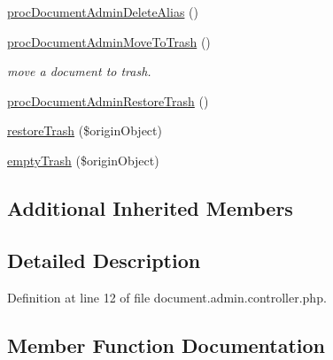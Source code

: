 \begin{DoxyCompactItemize}
\item 
\hyperlink{classdocumentAdminController_ab2f0c552145e0a56841e0aa7e8e03ae7}{proc\+Document\+Admin\+Delete\+Alias} ()
\item 
\hyperlink{classdocumentAdminController_a8dfa5d37621daaba6c66732eb3568730}{proc\+Document\+Admin\+Move\+To\+Trash} ()
\begin{DoxyCompactList}\small\item\em move a document to trash. \end{DoxyCompactList}\item 
\hyperlink{classdocumentAdminController_ac0467d27983d60c51c1128765244a36b}{proc\+Document\+Admin\+Restore\+Trash} ()
\item 
\hyperlink{classdocumentAdminController_a3750ffc8b40a8bbd46f5ac455e65cb37}{restore\+Trash} (\$origin\+Object)
\item 
\hyperlink{classdocumentAdminController_a52981a3af3d6b94661444f65568343ca}{empty\+Trash} (\$origin\+Object)
\end{DoxyCompactItemize}
\subsection*{Additional Inherited Members}


\subsection{Detailed Description}


Definition at line 12 of file document.\+admin.\+controller.\+php.



\subsection{Member Function Documentation}

